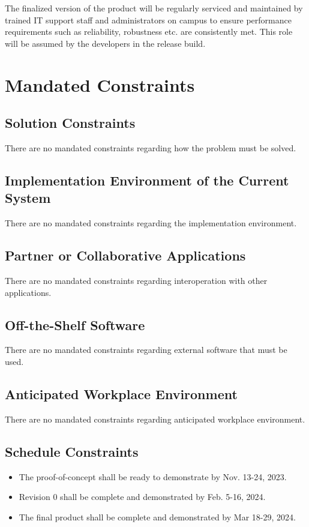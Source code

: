 \documentclass[12pt]{article}
\begin{document}
The finalized version of the product will be regularly serviced and maintained by trained IT support staff and administrators on campus to ensure performance requirements such as reliability, robustness etc. are consistently met. This role will be assumed by the developers in the release build.

\section{Mandated Constraints}
\subsection{Solution Constraints}
There are no mandated constraints regarding how the problem must be solved.
\subsection{Implementation Environment of the Current System}
There are no mandated constraints regarding the implementation environment.
\subsection{Partner or Collaborative Applications}
There are no mandated constraints regarding interoperation with other applications.
\subsection{Off-the-Shelf Software}
There are no mandated constraints regarding external software that must be used.
\subsection{Anticipated Workplace Environment}
There are no mandated constraints regarding anticipated workplace environment.
\subsection{Schedule Constraints}
\begin{itemize}
  \item The proof-of-concept shall be ready to demonstrate by Nov. 13-24, 2023.
  \item Revision 0 shall be complete and demonstrated by Feb. 5-16, 2024.
  \item The final product shall be complete and demonstrated by Mar 18-29, 2024.
\end{itemize}
\end{document}
